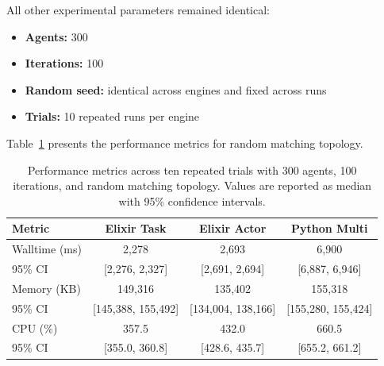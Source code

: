 \documentclass[
]{ceurart}
\begin{document}
All other experimental parameters remained identical:
\begin{itemize}
	\item \textbf{Agents:} 300
	\item \textbf{Iterations:} 100
	\item \textbf{Random seed:} identical across engines and fixed across runs
	\item \textbf{Trials:} 10 repeated runs per engine
\end{itemize}

Table~\ref{tab:runtime_trials_random} presents the performance metrics for random matching topology.

\begin{table}[ht]
\centering
\caption{Performance metrics across ten repeated trials with 300 agents, 100 iterations, and random matching topology.
Values are reported as median with 95\% confidence intervals.}\label{tab:runtime_trials_random}
\begin{tabular}{lccc}
\toprule
Metric & Elixir Task & Elixir Actor & Python Multi \\
\midrule
Walltime (ms) & 2,278 & 2,693 & 6,900 \\
95\% CI & [2,276, 2,327] & [2,691, 2,694] & [6,887, 6,946] \\
Memory (KB) & 149,316 & 135,402 & 155,318 \\
95\% CI & [145,388, 155,492] & [134,004, 138,166] & [155,280, 155,424] \\
CPU (\%) & 357.5 & 432.0 & 660.5 \\
95\% CI & [355.0, 360.8] & [428.6, 435.7] & [655.2, 661.2] \\
\bottomrule
\end{tabular}
\end{table}
\end{document}
